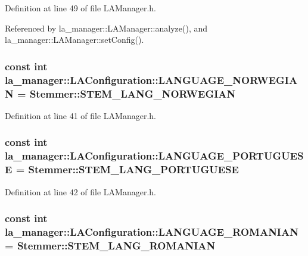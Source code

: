 Definition at line 49 of file LAManager.h.

Referenced by la\_\-manager::LAManager::analyze(), and la\_\-manager::LAManager::setConfig().\hypertarget{classla__manager_1_1LAConfiguration_a3aaa794eb886307ff56c15ccbd0447a}{
\subsubsection[{LANGUAGE\_\-NORWEGIAN}]{\setlength{\rightskip}{0pt plus 5cm}const int {\bf la\_\-manager::LAConfiguration::LANGUAGE\_\-NORWEGIAN} = Stemmer::STEM\_\-LANG\_\-NORWEGIAN}}
\label{classla__manager_1_1LAConfiguration_a3aaa794eb886307ff56c15ccbd0447a}




Definition at line 41 of file LAManager.h.\hypertarget{classla__manager_1_1LAConfiguration_886b546adfed6958a82b427545b7d91a}{
\subsubsection[{LANGUAGE\_\-PORTUGUESE}]{\setlength{\rightskip}{0pt plus 5cm}const int {\bf la\_\-manager::LAConfiguration::LANGUAGE\_\-PORTUGUESE} = Stemmer::STEM\_\-LANG\_\-PORTUGUESE}}
\label{classla__manager_1_1LAConfiguration_886b546adfed6958a82b427545b7d91a}




Definition at line 42 of file LAManager.h.\hypertarget{classla__manager_1_1LAConfiguration_badd19034cd02a738ab488e2f588a31a}{
\subsubsection[{LANGUAGE\_\-ROMANIAN}]{\setlength{\rightskip}{0pt plus 5cm}const int {\bf la\_\-manager::LAConfiguration::LANGUAGE\_\-ROMANIAN} = Stemmer::STEM\_\-LANG\_\-ROMANIAN}}
\label{classla__manager_1_1LAConfiguration_badd19034cd02a738ab488e2f588a31a}




